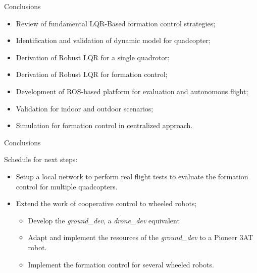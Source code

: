 \begin{frame}{Conclusions}
\begin{itemize}
\item Review of fundamental LQR-Based formation control strategies;
\item Identification and validation of dynamic model for quadcopter;
\item Derivation of Robust LQR for a single quadrotor;
\item Derivation of Robust LQR for formation control;
\item Development of ROS-based platform for evaluation and autonomous flight;
\item Validation for indoor and outdoor scenarios;
\item Simulation for formation control in centralized approach.
\end{itemize}
    
\end{frame}


\begin{frame}{Conclusions}

Schedule for next steps:

\begin{itemize}
	\item Setup a local network to perform real flight tests to evaluate the formation control for multiple quadcopters. 
	\item Extend the work of cooperative control to wheeled robots;
	\begin{itemize}
		\item Develop the \textit{ground\_dev}, a \textit{drone\_dev} equivalent
		\item Adapt and implement the resources of the \textit{ground\_dev} to a Pioneer 3AT robot.
		\item Implement the formation control for several wheeled robots. 
	\end{itemize}
\end{itemize}

\end{frame}

